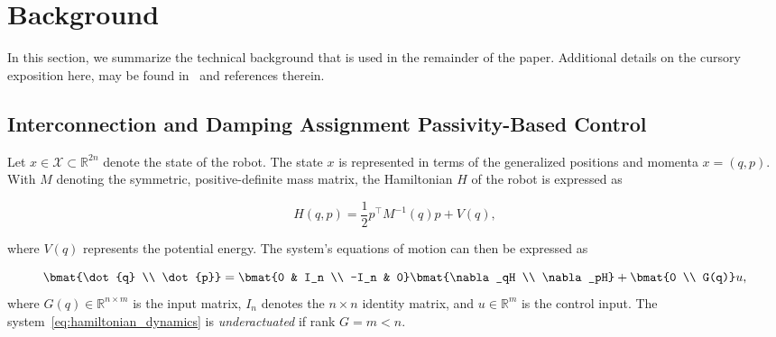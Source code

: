\section{Background}
\label{sec:background}

In this section, we summarize the technical background that is used in the
remainder of the paper. Additional details on the cursory exposition here, may be
found in~\citet{ortega2002stabilization,van2000l2} and references therein.





\subsection{Interconnection and Damping Assignment Passivity-Based Control}
\label{ssec:ida-pbc}

Let $x \in \mathcal{X} \subset \mathbb{R}^{2n}$ denote the state of the robot. The state $x$ is
represented in terms of the generalized positions and momenta $x = (q, p)$. 
%
%
With $M$ denoting the symmetric, positive-definite mass
matrix, the Hamiltonian $H$ of the robot is expressed as 

\begin{equation}
    H(q,p) = \frac{1}{2} p^\top M^{-1}(q) p + V(q),
    \label{eq:system_hamiltonian}
\end{equation}

\noindent where $V(q)$ represents the potential energy. The system's equations
of motion can then be expressed as 

\begin{equation}
    \bmat{\dot{q} \\ \dot{p}} = \bmat{0 & I_n \\ -I_n & 0}\bmat{\nabla_qH \\
    \nabla_pH} + \bmat{0 \\ G(q)}u,
    \label{eq:hamiltonian_dynamics}
\end{equation}
%
where $G(q) \in \mathbb{R}^{n \times m}$ is the input matrix, $I_n$ denotes the
$n \times n$ identity matrix, and $u \in \mathbb{R}^m$ is the control input.
%
The system~\eqref{eq:hamiltonian_dynamics} is \textit{underactuated} if rank $G = m < n$.

